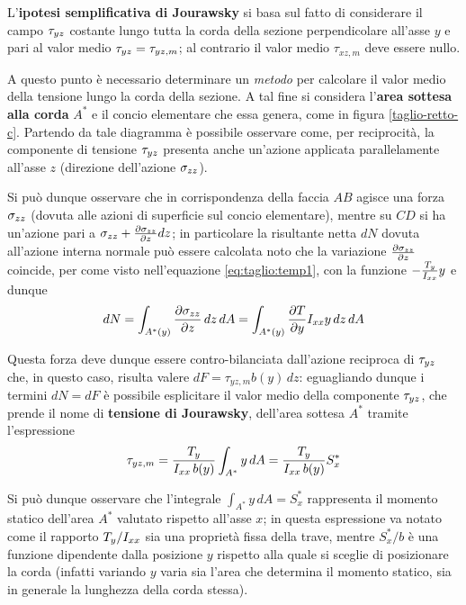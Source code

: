		\begin{concetto}
			L'\textbf{ipotesi semplificativa di Jourawsky} si basa sul fatto di considerare il campo $\tau_{yz}$ costante lungo tutta la corda della sezione perpendicolare all'asse $y$ e pari al valor medio $\tau_{yz} = \tau_{yz,m}$; al contrario il valor medio $\tau_{xz,m}$ deve essere nullo.
		\end{concetto}
		
		A questo punto è necessario determinare un \textit{metodo} per calcolare il valor medio della tensione lungo la corda della sezione. A tal fine si considera l'\textbf{area sottesa alla corda} $A^*$ e il concio elementare che essa genera, come in figura \ref{taglio-retto-c}. Partendo da tale diagramma è possibile osservare come, per reciprocità, la componente di tensione $\tau_{yz}$ presenta anche un'azione applicata parallelamente all'asse $z$ (direzione dell'azione $\sigma_{zz}$).
		
		
		Si può dunque osservare che in corrispondenza della faccia $AB$ agisce una forza $\sigma_{zz}$ (dovuta alle azioni di superficie sul concio elementare), mentre su $CD$ si ha un'azione pari a $\sigma_{zz} + \frac{\partial \sigma_{zz}}{\partial z} dz$; in particolare la risultante netta $dN$ dovuta all'azione interna normale può essere calcolata noto che la variazione $\frac{\partial \sigma_{zz}}{\partial z}$ coincide, per come visto nell'equazione \ref{eq:taglio:temp1}, con la funzione $-\frac {T_y}{I_{xx}} y$ e dunque
		\[ dN = \int_{A^*(y)} \frac{\partial \sigma_{zz}}{\partial z} \, dz\, dA = \int_{A^*(y)} \frac{\partial T}{\partial y} I_{xx} y \, dz \, dA \]
		
		\begin{concetto}
			Questa forza deve dunque essere contro-bilanciata dall'azione reciproca di $\tau_{yz}$ che, in questo caso, risulta valere $dF = \tau_{yz,m} b(y)\, dz$: eguagliando dunque i termini $dN = dF$ è possibile esplicitare il valor medio della componente $\tau_{yz}$, che prende il nome di \textbf{tensione di Jourawsky}, dell'area sottesa $A^*$ tramite l'espressione
			\begin{equation} \label{eq:taglio:retto}
				\tau_{yz,m} = \frac{T_y  }{I_{xx} \, b(y)}\int_{A^*} y\, dA  = \frac{T_y  }{I_{xx} \, b(y)} S_x^*
			\end{equation}
		\end{concetto}
		Si può dunque osservare che l'integrale $\int_{A^*}y\,dA = S_x^*$ rappresenta il momento statico dell'area $A^*$ valutato rispetto all'asse $x$; in questa espressione va notato come il rapporto $T_y/I_{xx}$ sia una proprietà fissa della trave, mentre $S_x^*/b$ è una funzione dipendente dalla posizione $y$ rispetto alla quale si sceglie di posizionare la corda (infatti variando $y$ varia sia l'area che determina il momento statico, sia in generale la lunghezza della corda stessa).
		
